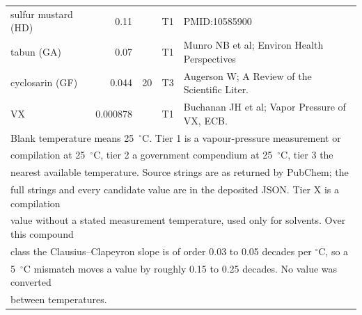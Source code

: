\begin{tabular}{lrccl}
sulfur mustard (HD) & 0.11 &  & T1 & PMID:10585900 \\
tabun (GA) & 0.07 &  & T1 & Munro NB et al; Environ Health Perspectives \\
cyclosarin (GF) & 0.044 & 20 & T3 & Augerson W; A Review of the Scientific Liter. \\
VX & 0.000878 &  & T1 & Buchanan JH et al; Vapor Pressure of VX, ECB. \\
\hline
\multicolumn{5}{l}{\footnotesize Blank temperature means 25~$^{\circ}$C. Tier 1 is a vapour-pressure measurement or}\\
\multicolumn{5}{l}{\footnotesize compilation at 25~$^{\circ}$C, tier 2 a government compendium at 25~$^{\circ}$C, tier 3 the}\\
\multicolumn{5}{l}{\footnotesize nearest available temperature. Source strings are as returned by PubChem; the}\\
\multicolumn{5}{l}{\footnotesize full strings and every candidate value are in the deposited JSON. Tier X is a compilation}\\
\multicolumn{5}{l}{\footnotesize value without a stated measurement temperature, used only for solvents. Over this compound}\\
\multicolumn{5}{l}{\footnotesize class the Clausius--Clapeyron slope is of order 0.03 to 0.05 decades per $^{\circ}$C, so a}\\
\multicolumn{5}{l}{\footnotesize 5~$^{\circ}$C mismatch moves a value by roughly 0.15 to 0.25 decades. No value was converted}\\
\multicolumn{5}{l}{\footnotesize between temperatures.}\\
\end{tabular}
